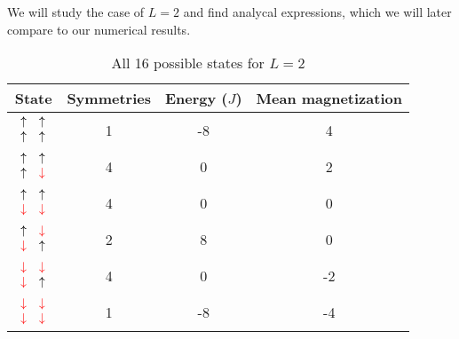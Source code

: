 \documentclass[a4paper]{article}
\begin{document}
 We will study the case of $L = 2$ and find analycal expressions, which we will later compare to our numerical results.
\begin{table}[htb]
\begin{center}
\begin{tabular}{cccc}
    State & Symmetries & Energy ($J$) & Mean magnetization \\ \hline
    $ \begin{array}{cc}
        \uparrow&\uparrow \\
        \uparrow&\uparrow
    \end{array} $ &
    1 & %
    -8 & %
    4   %
    \\ \hline
    $ \begin{array}{cc}
        \uparrow&\uparrow \\
        \uparrow&{\color{red}\downarrow}
    \end{array} $ &
    4 & %
    0 & %
    2   %
    \\ \hline
    $ \begin{array}{cc}
        \uparrow&\uparrow \\
        {\color{red}\downarrow}&{\color{red}\downarrow}
    \end{array} $ &
    4 & %
    0 & %
    0   %
    \\ \hline
    $ \begin{array}{cc}
        \uparrow&{\color{red}\downarrow} \\
        {\color{red}\downarrow}&\uparrow
    \end{array} $ &
    2 & %
    8 & %
    0   %
    \\ \hline
    $ \begin{array}{cc}
        {\color{red}\downarrow}&{\color{red}\downarrow} \\
        {\color{red}\downarrow}&\uparrow
    \end{array} $ &
    4 & %
    0 & %
    -2   %
    \\ \hline
    $ \begin{array}{cc}
        {\color{red}\downarrow}&{\color{red}\downarrow} \\
        {\color{red}\downarrow}&{\color{red}\downarrow}
    \end{array} $ &
    1 & %
    -8 & %
    -4   %
    \\ \hline
\end{tabular}
\end{center}
\caption{All 16 possible states for $L=2$}
\end{table}
\end{document}
